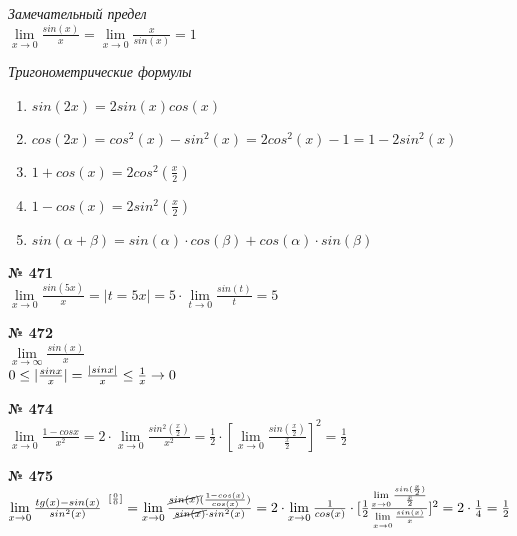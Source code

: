 \documentclass[12pt]{article}
\DeclarePairedDelimiter\abs{\lvert}{\rvert}%
\newcommand*\circled[1]{\tikz[baseline=(char.base)]{
		\node[shape=circle,draw,inner sep=2pt] (char) {#1};}}
\begin{document}
{
	\vspace{1cm}
	{\emph{\large{\circled{1} Замечательный предел}} \vspace{.1cm}\\
	$\lim\limits_{x \to 0} \frac{sin(x)}{x} = \lim\limits_{x \to 0} \frac{x}{sin(x)} = 1$ \vspace{.4cm}\\
}
{
	\emph{\large{\circled{2} Тригонометрические формулы}}
	\begin{enumerate}
		\item $sin(2x)=2sin(x)cos(x)$
		\item $cos(2x)=cos^2(x)-sin^2(x)=2cos^2(x)-1=1-2sin^2(x)$
		\item $1+cos(x)=2cos^2(\frac{x}{2})$
		\item $1-cos(x)=2sin^2(\frac{x}{2})$
		\item $sin(\alpha + \beta)=sin(\alpha)\cdot cos(\beta)+cos(\alpha)\cdot sin(\beta)$\\
		
	\end{enumerate}
}

\vspace{.5cm}
{
	{\textbf{№ 471} \vspace{.5cm}\\}
	\large{ $\lim\limits_{x \to 0}\frac{sin(5x)}{x}= |t = 5x| = 5 \cdot \lim\limits_{t \to 0} \frac{sin(t)}{t} = 5$
	}
}

\vspace{.5cm}
{
	{\textbf{№ 472} \vspace{.5cm}\\}
	\large{ $\lim\limits_{x\to \infty} \frac{sin(x)}{x}$\\
		$0 \leq \abs{\frac{sinx}{x}}=\frac{\abs{sinx}}{x} \leq \frac{1}{x} \to 0$\\
	}
}

\vspace{.5cm}
{
	{\textbf{№ 474} \vspace{.5cm}\\}
	\large{ $\lim\limits_{x \to 0} \frac{1-cosx}{x^2}=2 \cdot \lim\limits_{x \to 0}  \frac{sin^2(\frac{x}{2})}{x^2} = \frac{1}{2} \cdot [\lim\limits_{x \to 0}\frac{sin(\frac{x}{2})}{\frac{x}{2}}]^2 = \frac{1}{2}$
	}
}

\newpage
{
	{\textbf{№ 475} \vspace{.5cm}\\}
	\large{ $\lim\limits_{x \to 0} \frac{tg(x)-sin(x)}{sin^2(x)}^{\enspace [\frac{0}{0}]} = \lim\limits_{x \to 0} \frac{\cancel{sin(x)}(\frac{1-cos(x)}{cos(x)})}{\cancel{sin(x)}\cdot sin^2(x)}=2\cdot \lim\limits_{x \to 0} \frac{1}{cos(x)} \cdot [\frac{1}{2}\frac{\lim\limits_{x \to 0}\frac{sin(\frac{x}{2})}{\frac{x}{2}}}{\lim\limits_{x \to 0}\frac{sin(x)}{x}}]^2=2 \cdot \frac{1}{4} = \frac{1}{2}$
	}
}

}
\end{document}
